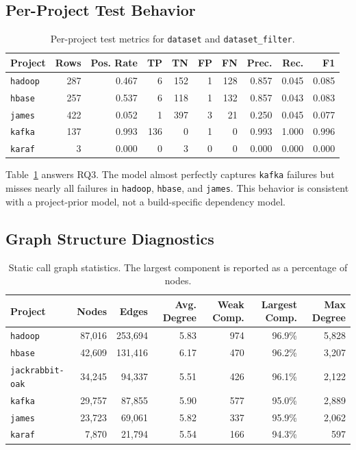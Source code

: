 \subsection{Per-Project Test Behavior}

\begin{table}[ht]
    \centering
    \caption{Per-project test metrics for \texttt{dataset} and \texttt{dataset\_filter}.}
    \label{tab:per_project_results}
    \begin{tabular}{lrrrrrrrrr}
        \toprule
        Project & Rows & Pos. Rate & TP & TN & FP & FN & Prec. & Rec. & F1 \\
        \midrule
        \texttt{hadoop} & 287 & 0.467 & 6 & 152 & 1 & 128 & 0.857 & 0.045 & 0.085 \\
        \texttt{hbase} & 257 & 0.537 & 6 & 118 & 1 & 132 & 0.857 & 0.043 & 0.083 \\
        \texttt{james} & 422 & 0.052 & 1 & 397 & 3 & 21 & 0.250 & 0.045 & 0.077 \\
        \texttt{kafka} & 137 & 0.993 & 136 & 0 & 1 & 0 & 0.993 & 1.000 & 0.996 \\
        \texttt{karaf} & 3 & 0.000 & 0 & 3 & 0 & 0 & 0.000 & 0.000 & 0.000 \\
        \bottomrule
    \end{tabular}
\end{table}

Table~\ref{tab:per_project_results} answers RQ3. The model almost perfectly captures \texttt{kafka} failures but misses nearly all failures in \texttt{hadoop}, \texttt{hbase}, and \texttt{james}. This behavior is consistent with a project-prior model, not a build-specific dependency model.

\subsection{Graph Structure Diagnostics}

\begin{table}[ht]
    \centering
    \caption{Static call graph statistics. The largest component is reported as a percentage of nodes.}
    \label{tab:graph_stats}
    \begin{tabular}{lrrrrrr}
        \toprule
        Project & Nodes & Edges & Avg. Degree & Weak Comp. & Largest Comp. & Max Degree \\
        \midrule
        \texttt{hadoop} & 87,016 & 253,694 & 5.83 & 974 & 96.9\% & 5,828 \\
        \texttt{hbase} & 42,609 & 131,416 & 6.17 & 470 & 96.2\% & 3,207 \\
        \texttt{jackrabbit-oak} & 34,245 & 94,337 & 5.51 & 426 & 96.1\% & 2,122 \\
        \texttt{kafka} & 29,757 & 87,855 & 5.90 & 577 & 95.0\% & 2,889 \\
        \texttt{james} & 23,723 & 69,061 & 5.82 & 337 & 95.9\% & 2,062 \\
        \texttt{karaf} & 7,870 & 21,794 & 5.54 & 166 & 94.3\% & 597 \\
        \bottomrule
    \end{tabular}
\end{table}

